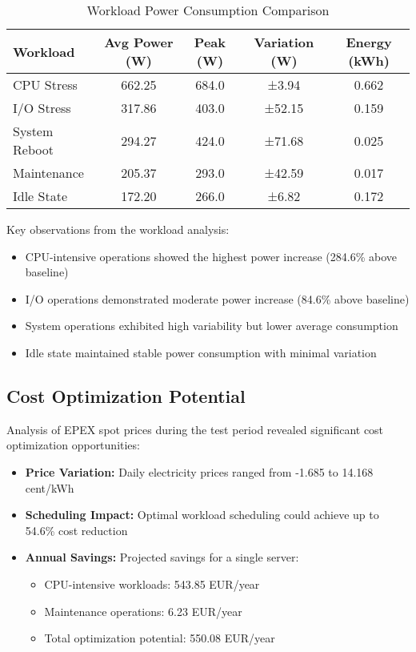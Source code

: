 \begin{table}[h]
\caption{Workload Power Consumption Comparison}
\label{tab:workload-comparison}
\begin{tabular}{lcccc}
\hline
\textbf{Workload} & \textbf{Avg Power (W)} & \textbf{Peak (W)} & \textbf{Variation (W)} & \textbf{Energy (kWh)} \\
\hline
CPU Stress & 662.25 & 684.0 & ±3.94 & 0.662 \\
I/O Stress & 317.86 & 403.0 & ±52.15 & 0.159 \\
System Reboot & 294.27 & 424.0 & ±71.68 & 0.025 \\
Maintenance & 205.37 & 293.0 & ±42.59 & 0.017 \\
Idle State & 172.20 & 266.0 & ±6.82 & 0.172 \\
\hline
\end{tabular}
\end{table}

Key observations from the workload analysis:
\begin{itemize}
    \item CPU-intensive operations showed the highest power increase (284.6\% above baseline)
    \item I/O operations demonstrated moderate power increase (84.6\% above baseline)
    \item System operations exhibited high variability but lower average consumption
    \item Idle state maintained stable power consumption with minimal variation
\end{itemize}

\subsection{Cost Optimization Potential}
\label{results:optimization}
Analysis of EPEX spot prices during the test period revealed significant cost optimization opportunities:

\begin{itemize}
    \item \textbf{Price Variation:} Daily electricity prices ranged from -1.685 to 14.168 cent/kWh
    \item \textbf{Scheduling Impact:} Optimal workload scheduling could achieve up to 54.6\% cost reduction
    \item \textbf{Annual Savings:} Projected savings for a single server:
    \begin{itemize}
        \item CPU-intensive workloads: 543.85 EUR/year
        \item Maintenance operations: 6.23 EUR/year
        \item Total optimization potential: 550.08 EUR/year
    \end{itemize}
\end{itemize}

